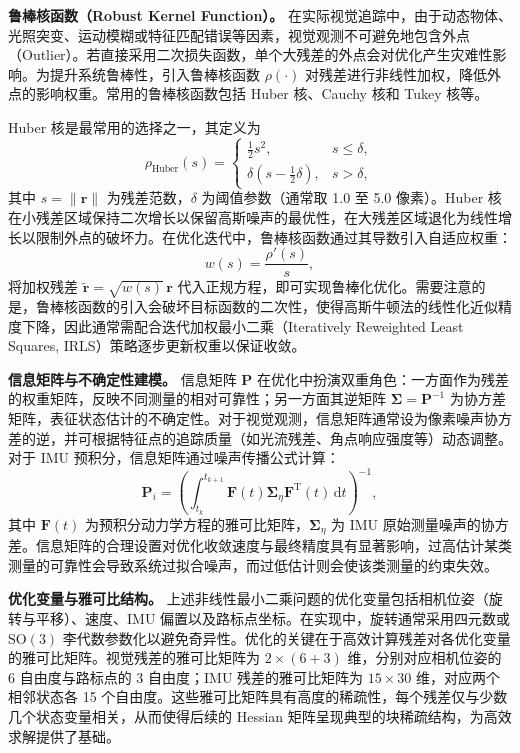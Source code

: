 \textbf{鲁棒核函数（Robust Kernel Function）。}
在实际视觉追踪中，由于动态物体、光照突变、运动模糊或特征匹配错误等因素，视觉观测不可避免地包含外点（Outlier）。若直接采用二次损失函数，单个大残差的外点会对优化产生灾难性影响。为提升系统鲁棒性，引入鲁棒核函数 $\rho(\cdot)$ 对残差进行非线性加权，降低外点的影响权重。常用的鲁棒核函数包括 Huber 核、Cauchy 核和 Tukey 核等。

Huber 核是最常用的选择之一，其定义为
\begin{equation}
    \rho_{\mathrm{Huber}}(s) = \begin{cases}
        \frac{1}{2}s^2, & s\leq\delta, \\
        \delta\!\left(s-\frac{1}{2}\delta\right), & s>\delta,
    \end{cases}
\end{equation}
其中 $s=\|\mathbf{r}\|$ 为残差范数，$\delta$ 为阈值参数（通常取 1.0 至 5.0 像素）。Huber 核在小残差区域保持二次增长以保留高斯噪声的最优性，在大残差区域退化为线性增长以限制外点的破坏力。在优化迭代中，鲁棒核函数通过其导数引入自适应权重：
\begin{equation}
    w(s) = \frac{\rho'(s)}{s},
\end{equation}
将加权残差 $\tilde{\mathbf{r}}=\sqrt{w(s)}\,\mathbf{r}$ 代入正规方程，即可实现鲁棒化优化。需要注意的是，鲁棒核函数的引入会破坏目标函数的二次性，使得高斯牛顿法的线性化近似精度下降，因此通常需配合迭代加权最小二乘（Iteratively Reweighted Least Squares, IRLS）策略逐步更新权重以保证收敛。

\textbf{信息矩阵与不确定性建模。}
信息矩阵 $\mathbf{P}$ 在优化中扮演双重角色：一方面作为残差的权重矩阵，反映不同测量的相对可靠性；另一方面其逆矩阵 $\mathbf{\Sigma}=\mathbf{P}^{-1}$ 为协方差矩阵，表征状态估计的不确定性。对于视觉观测，信息矩阵通常设为像素噪声协方差的逆，并可根据特征点的追踪质量（如光流残差、角点响应强度等）动态调整。对于 IMU 预积分，信息矩阵通过噪声传播公式计算：
\begin{equation}
    \mathbf{P}_i = \left(\int_{t_k}^{t_{k+1}} \mathbf{F}(t)\mathbf{\Sigma}_{\eta}\mathbf{F}^{\mathrm{T}}(t)\,\mathrm{d}t\right)^{-1},
\end{equation}
其中 $\mathbf{F}(t)$ 为预积分动力学方程的雅可比矩阵，$\mathbf{\Sigma}_{\eta}$ 为 IMU 原始测量噪声的协方差。信息矩阵的合理设置对优化收敛速度与最终精度具有显著影响，过高估计某类测量的可靠性会导致系统过拟合噪声，而过低估计则会使该类测量的约束失效。

\textbf{优化变量与雅可比结构。}
上述非线性最小二乘问题的优化变量包括相机位姿（旋转与平移）、速度、IMU 偏置以及路标点坐标。在实现中，旋转通常采用四元数或 $\mathrm{SO}(3)$ 李代数参数化以避免奇异性。优化的关键在于高效计算残差对各优化变量的雅可比矩阵。视觉残差的雅可比矩阵为 $2\times(6+3)$ 维，分别对应相机位姿的 6 自由度与路标点的 3 自由度；IMU 残差的雅可比矩阵为 $15\times 30$ 维，对应两个相邻状态各 15 个自由度。这些雅可比矩阵具有高度的稀疏性，每个残差仅与少数几个状态变量相关，从而使得后续的 Hessian 矩阵呈现典型的块稀疏结构，为高效求解提供了基础。


